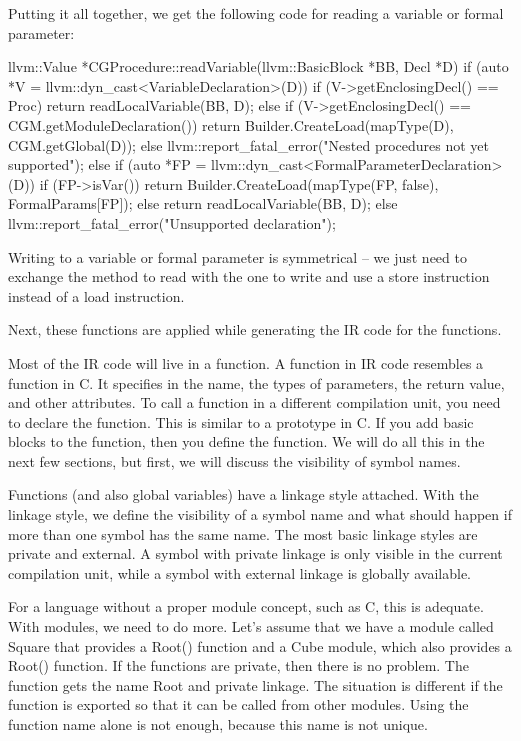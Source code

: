 Putting it all together, we get the following code for reading a variable or formal parameter:

\begin{cpp}
llvm::Value *CGProcedure::readVariable(llvm::BasicBlock *BB,
Decl *D) {
    if (auto *V = llvm::dyn_cast<VariableDeclaration>(D)) {
        if (V->getEnclosingDecl() == Proc)
            return readLocalVariable(BB, D);
        else if (V->getEnclosingDecl() == CGM.getModuleDeclaration()) {
            return Builder.CreateLoad(mapType(D),
            CGM.getGlobal(D));
        } else
        llvm::report_fatal_error("Nested procedures not yet supported");
    } else if (auto *FP = llvm::dyn_cast<FormalParameterDeclaration>(D)) {
        if (FP->isVar()) {
            return Builder.CreateLoad(mapType(FP, false),
            FormalParams[FP]);
        } else
        return readLocalVariable(BB, D);
    } else
        llvm::report_fatal_error("Unsupported declaration");
}
\end{cpp}

Writing to a variable or formal parameter is symmetrical – we just need to exchange the method to read with the one to write and use a store instruction instead of a load instruction.

Next, these functions are applied while generating the IR code for the functions.


Most of the IR code will live in a function. A function in IR code resembles a function in C. It specifies in the name, the types of parameters, the return value, and other attributes. To call a function in a different compilation unit, you need to declare the function. This is similar to a prototype in C. If you add basic blocks to the function, then you define the function. We will do all this in the next few sections, but first, we will discuss the visibility of symbol names.



Functions (and also global variables) have a linkage style attached. With the linkage style, we define the visibility of a symbol name and what should happen if more than one symbol has the same name. The most basic linkage styles are private and external. A symbol with private linkage is only visible in the current compilation unit, while a symbol with external linkage is globally available.

For a language without a proper module concept, such as C, this is adequate. With modules, we need to do more. Let’s assume that we have a module called Square that provides a Root() function and a Cube module, which also provides a Root() function. If the functions are private, then there is no problem. The function gets the name Root and private linkage. The situation is different if the function is exported so that it can be called from other modules. Using the function name alone is not enough, because this name is not unique.

